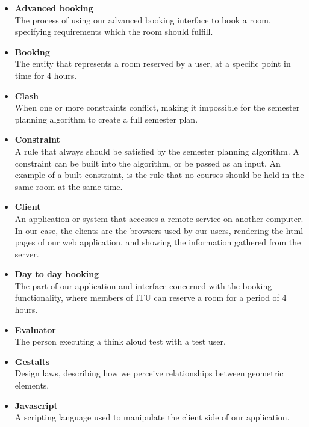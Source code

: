 \begin{itemize}
\item \textbf{Advanced booking}\\
The process of using our advanced booking interface to book a room, specifying requirements which the room should fulfill. 
	
\item \textbf{Booking}\\ 
The entity that represents a room reserved by a user, at a specific point in time for 4 hours.

\item \textbf{Clash}\\
When one or more constraints conflict, making it impossible for the semester planning algorithm to create a full semester plan.

\item \textbf{Constraint}\\
A rule that always should be satisfied by the semester planning algorithm. A constraint can be built into the algorithm, or be passed as an input. An example of a built constraint, is the rule that no courses should be held in the same room at the same time.

\item \textbf{Client}\\
An application or system that accesses a remote service on another computer. In our case, the clients are the browsers used by our users, rendering the html pages of our web application, and showing the information gathered from the server.

\item \textbf{Day to day booking}\\
The part of our application and interface concerned with the booking functionality, where members of ITU can reserve a room for a period of 4 hours.

\item \textbf{Evaluator}\\
The person executing a think aloud test with a test user.

\item \textbf{Gestalts}\\
Design laws, describing how we perceive relationships between geometric elements.

\item \textbf{Javascript}\\
A scripting language used to manipulate the client side of our application.
	

\end{itemize}
